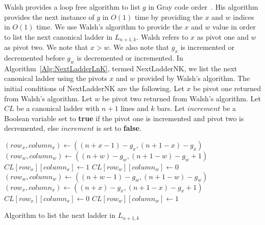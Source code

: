  Walsh provides a loop free algorithm to list $g$ in Gray code order~\cite{A41}. His algorithm provides the next 
 instance of $g$ in $O(1)$ time by providing the $x$ and $w$ indices in $O(1)$ time. We use Walsh's algorithm 
 to provide the $x$ and $w$ value in order to list the next canonical ladder in $L_{n+1, k}$. Walsh refers to $x$ as 
 pivot one and $w$ as pivot two. We note that $x>w$. We also note that $g_{x}$ is incremented or decremented 
 before $g_{w}$ is decremented or incremented. In Algorithm~\ref{Alg:NextLadderLnK}, 
 termed {\sc NextLadderNK}, we list the next canonical ladder using the pivots $x$ and $w$ provided by Walsh's algorithm. The initial conditions 
 of {\sc NextLadderNK} are the following. Let $x$ be pivot one returned from Walsh's algorithm. Let $w$ be pivot two 
 returned from Walsh's algorithm. Let $CL$ be a canonical ladder with $n+1$ lines and $k$ bars. Let $increment$ be a Boolean 
 variable set to \textbf{true} if the pivot one is incremented and pivot two is decremented, else $increment$ is set to \textbf{false}. 
\begin{algorithm}
  \begin{algorithmic}[1]
       
        \State $(row_{x}, column_{x}) \gets  ((n+x-1)-g_{x}, (n+1-x)-g_{x})$
        \State $(row_{w}, column_{w}) \gets  ((n+w)-g_{w}, (n+1-w)-g_{w}+1)$
        \State $CL[row_{x}][column_{x}] \gets 1$
        \State $CL[row_{w}][column_{w}] \gets 0$
      \Else {}
        \State $(row_{w}, column_{w}) \gets  ((n+w-1)-g_{w}, (n+1-w)-g_{w})$
        \State $(row_{x}, column_{x}) \gets  ((n+x)-g_{x}, (n+1-x)-g_{x}+1)$
        \State $CL[row_{x}][column_{x}] \gets 0$
        \State $CL[row_{w}][column_{w}] \gets 1$
      \EndIf
   \EndFunction
  \end{algorithmic}
  \caption{Algorithm to list the next ladder in $L_{n+1, k}$}
  \label{Alg:NextLadderLnK}
\end{algorithm}

